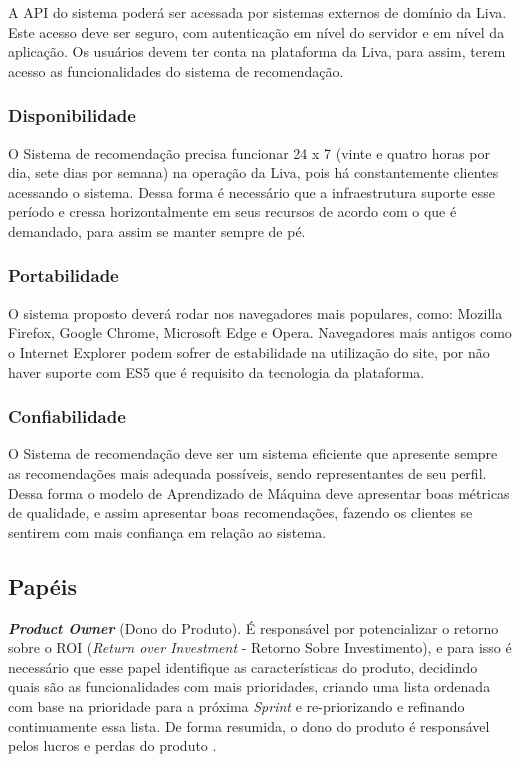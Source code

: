 A API do sistema poderá ser acessada por sistemas externos de domínio da Liva. Este acesso deve ser seguro, com autenticação em nível do servidor e em nível da aplicação. Os usuários devem ter conta na plataforma da Liva, para assim, terem acesso as funcionalidades do sistema de recomendação.

\subsubsection{Disponibilidade}

O Sistema de recomendação precisa funcionar 24 x 7 (vinte e quatro horas por dia, sete dias por semana) na operação da Liva, pois há constantemente clientes acessando o sistema. Dessa forma é necessário que a infraestrutura suporte esse período e cressa horizontalmente em seus recursos de acordo com o que é demandado, para assim se manter sempre de pé.

\subsubsection{Portabilidade}

O sistema proposto deverá rodar nos navegadores mais populares, como: Mozilla Firefox, Google Chrome, Microsoft Edge e Opera. Navegadores mais antigos como o Internet Explorer podem sofrer de estabilidade na utilização do site, por não haver suporte com ES5 que é requisito da tecnologia da plataforma.

\subsubsection{Confiabilidade}

O Sistema de recomendação deve ser um sistema eficiente que apresente sempre as recomendações mais adequada possíveis, sendo representantes de seu perfil. Dessa forma o modelo de Aprendizado de Máquina deve apresentar boas métricas de qualidade, e assim apresentar boas recomendações, fazendo os clientes se sentirem com mais confiança em relação ao sistema.

\subsection{Papéis}

\textbf{\textit{Product Owner}} (Dono do Produto). É responsável por potencializar o retorno sobre o ROI (\textit{Return over Investment} - Retorno Sobre Investimento), e para isso é necessário que esse papel identifique as características do produto, decidindo quais são as funcionalidades com mais prioridades, criando uma lista ordenada com base na prioridade para a próxima \textit{Sprint} e re-priorizando e refinando continuamente essa lista. De forma resumida, o dono do produto é responsável pelos lucros e perdas do produto \cite{Sutherland}.

